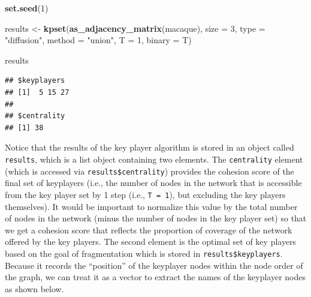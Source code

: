 \documentclass[
]{book}
\newenvironment{Shaded}{\begin{snugshade}}{\end{snugshade}}
\newcommand{\AttributeTok}[1]{\textcolor[rgb]{0.13,0.29,0.53}{#1}}
\newcommand{\CommentTok}[1]{\textcolor[rgb]{0.56,0.35,0.01}{\textit{#1}}}
\newcommand{\DecValTok}[1]{\textcolor[rgb]{0.00,0.00,0.81}{#1}}
\newcommand{\FunctionTok}[1]{\textcolor[rgb]{0.13,0.29,0.53}{\textbf{#1}}}
\newcommand{\NormalTok}[1]{#1}
\newcommand{\OtherTok}[1]{\textcolor[rgb]{0.56,0.35,0.01}{#1}}
\newcommand{\SpecialCharTok}[1]{\textcolor[rgb]{0.81,0.36,0.00}{\textbf{#1}}}
\newcommand{\StringTok}[1]{\textcolor[rgb]{0.31,0.60,0.02}{#1}}
\begin{document}
\begin{Shaded}
\begin{Highlighting}[]
\FunctionTok{set.seed}\NormalTok{(}\DecValTok{1}\NormalTok{)}

\NormalTok{results }\OtherTok{\textless{}{-}} \FunctionTok{kpset}\NormalTok{(}\FunctionTok{as\_adjacency\_matrix}\NormalTok{(macaque), }
                 \AttributeTok{size =} \DecValTok{3}\NormalTok{, }
                 \AttributeTok{type =} \StringTok{"diffusion"}\NormalTok{, }
                 \AttributeTok{method =} \StringTok{"union"}\NormalTok{, }
                 \AttributeTok{T =} \DecValTok{1}\NormalTok{, }
                 \AttributeTok{binary =}\NormalTok{ T)}

\NormalTok{results }
\end{Highlighting}
\end{Shaded}

\begin{verbatim}
## $keyplayers
## [1]  5 15 27
## 
## $centrality
## [1] 38
\end{verbatim}

Notice that the results of the key player algorithm is stored in an object called \texttt{results}, which is a list object containing two elements. The \texttt{centrality} element (which is accessed via \texttt{results\$centrality}) provides the cohesion score of the final set of keyplayers (i.e., the number of nodes in the network that is accessible from the key player set by 1 step (i.e., \texttt{T\ =\ 1}), but excluding the key players themselves). It would be important to normalize this value by the total number of nodes in the network (minus the number of nodes in the key player set) so that we get a cohesion score that reflects the proportion of coverage of the network offered by the key players. The second element is the optimal set of key players based on the goal of fragmentation which is stored in \texttt{results\$keyplayers}. Because it records the ``position'' of the keyplayer nodes within the node order of the graph, we can treat it as a vector to extract the names of the keyplayer nodes as shown below.

\begin{Shaded}
\end{Shaded}
\end{document}

